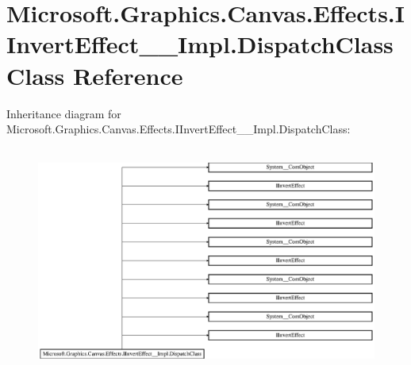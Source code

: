 \hypertarget{class_microsoft_1_1_graphics_1_1_canvas_1_1_effects_1_1_i_invert_effect_____impl_1_1_dispatch_class}{}\section{Microsoft.\+Graphics.\+Canvas.\+Effects.\+I\+Invert\+Effect\+\_\+\+\_\+\+Impl.\+Dispatch\+Class Class Reference}
\label{class_microsoft_1_1_graphics_1_1_canvas_1_1_effects_1_1_i_invert_effect_____impl_1_1_dispatch_class}
Inheritance diagram for Microsoft.\+Graphics.\+Canvas.\+Effects.\+I\+Invert\+Effect\+\_\+\+\_\+\+Impl.\+Dispatch\+Class\+:\begin{figure}[H]
\begin{center}
\leavevmode
\includegraphics[height=7.512195cm]{class_microsoft_1_1_graphics_1_1_canvas_1_1_effects_1_1_i_invert_effect_____impl_1_1_dispatch_class}
\end{center}
\end{figure}
